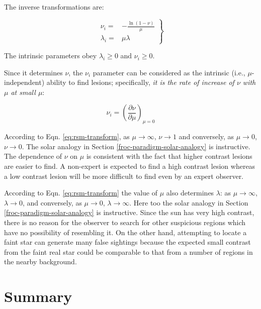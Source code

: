 \documentclass[
]{book}
\begin{document}
The inverse transformations are:

\begin{equation}
\left. 
\begin{aligned}
\nu_i =& - \frac{\ln \left ( 1-\nu \right )}{\mu}\\
\lambda_i =& \mu \lambda 
\end{aligned}
\right \}
\label{eq:rsm-inv-transform}
\end{equation}

The intrinsic parameters obey \(\lambda_i \ge 0\) and \(\nu_i \ge 0\).

Since it determines \(\nu\), the \(\nu_i\) parameter can be considered as the intrinsic (i.e., \(\mu\)-independent) ability to find lesions; specifically, \emph{it is the rate of increase of \(\nu\) with \(\mu\) at small \(\mu\)}:

\begin{equation} 
\nu_i = \left (\frac{\partial \nu}{\partial \mu}  \right )_{\mu = 0}
\label{eq:rsm-nup-limit}
\end{equation}

According to Eqn. \eqref{eq:rsm-transform}, as \(\mu \rightarrow \infty\), \(\nu \rightarrow 1\) and conversely, as \(\mu \rightarrow 0\), \(\nu \rightarrow 0\). The solar analogy in Section \ref{froc-paradigm-solar-analogy} is instructive. The dependence of \(\nu\) on \(\mu\) is consistent with the fact that higher contrast lesions are easier to find. A non-expert is expected to find a high contrast lesion whereas a low contrast lesion will be more difficult to find even by an expert observer.

According to Eqn. \eqref{eq:rsm-transform} the value of \(\mu\) also determines \(\lambda\): as \(\mu \rightarrow \infty\), \(\lambda \rightarrow 0\), and conversely, as \(\mu \rightarrow 0\), \(\lambda \rightarrow \infty\). Here too the solar analogy in Section \ref{froc-paradigm-solar-analogy} is instructive. Since the sun has very high contrast, there is no reason for the observer to search for other suspicious regions which have no possibility of resembling it. On the other hand, attempting to locate a faint star can generate many false sightings because the expected small contrast from the faint real star could be comparable to that from a number of regions in the nearby background.

\hypertarget{rsm-discussion-summary}{%
\section{Summary}\label{rsm-discussion-summary}}
\end{document}
